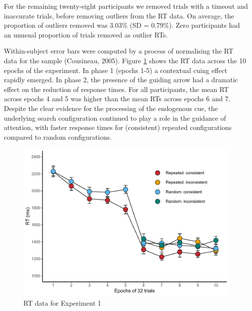 \documentclass[
  man,floatsintext]{apa7}
\begin{document}
For the remaining twenty-eight participants we removed trials with a timeout and inaccurate trials, before removing outliers from the RT data. On average, the proportion of outliers removed was 3.03\% (SD = 0.79\%). Zero participants had an unusual proportion of trials removed as outlier RTs.



Within-subject error bars were computed by a process of normalising the RT data for the sample (Cousineau, 2005). Figure \ref{fig:Exp1-RT-figure} shows the RT data across the 10 epochs of the experiment. In phase 1 (epochs 1-5) a contextual cuing effect rapidly emerged. In phase 2, the presence of the guiding arrow had a dramatic effect on the reduction of response times. For all participants, the mean RT across epochs 4 and 5 was higher than the mean RTs across epochs 6 and 7. Despite the clear evidence for the processing of the endogenous cue, the underlying search configuration continued to play a role in the guidance of attention, with faster response times for (consistent) repeated configurations compared to random configurations.

\begin{figure}

{\centering \includegraphics{CCC_ms1_files/figure-latex/Exp1-RT-figure-1} 

}

\caption{RT data for Experiment 1}\label{fig:Exp1-RT-figure}
\end{figure}
\end{document}
